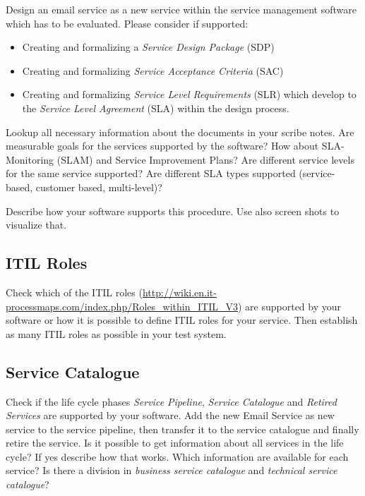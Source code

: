Design an email service as a new service within the service management software which has to be evaluated. Please consider if supported:
\begin{itemize}
\item Creating and formalizing a \emph{Service Design Package} (SDP)
\item Creating and formalizing \emph{Service Acceptance Criteria} (SAC)
\item Creating and formalizing \emph{Service Level Requirements} (SLR) which develop to the \emph{Service Level Agreement} (SLA) within the design process.
\end{itemize}

Lookup all necessary information about the documents in your scribe notes. Are measurable goals for the services supported by the software? How about SLA-Monitoring (SLAM) and Service Improvement Plans? Are different service levels for the same service supported? Are different SLA types supported (service-based, customer based, multi-level)?

Describe how your software supports this procedure. Use also screen shots to visualize that.

\subsection{ITIL Roles}
\label{sec:itilRoles}

Check which of the ITIL roles (\url{http://wiki.en.it-processmaps.com/index.php/Roles_within_ITIL_V3}) are supported by your software or how it is possible to define ITIL roles for your service. Then establish as many ITIL roles as possible in your test system.

\subsection{Service Catalogue}
\label{sec:serviceCatalogue}

Check if the life cycle phases \emph{Service Pipeline}, \emph{Service Catalogue} and \emph{Retired Services} are supported by your software. Add the new Email Service as new service to the service pipeline, then transfer it to the service catalogue and finally retire the service. Is it possible to get information about all services in the life cycle? If yes describe how that works. Which information are available for each service? Is there a division in \emph{business service catalogue} and \emph{technical service catalogue}?

